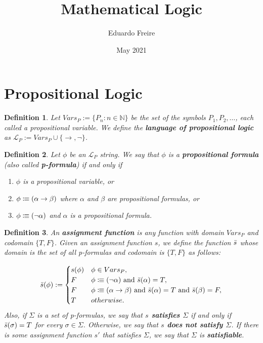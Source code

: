 \documentclass[leqno]{article}
\title{Mathematical Logic}
\author{Eduardo Freire}
\date{May 2021}
\newtheorem{definition}{Definition}[section]
\newcommand{\N}{\mathbb{N}}
\newcommand{\set}[1]{\{#1\}}
\newcommand{\lang}{\mathcal{L}}
\newcommand{\is}{\colonequiv}
\newcommand{\limplies}{\rightarrow}
\begin{document}
\maketitle

\section{Propositional Logic}
\begin{definition}
    Let $Vars_P := \set{P_n: n \in \N}$  be the set of the symbols $P_1, P_2, \dots $, each called a propositional variable. We define the \textbf{language of propositional logic} as $\lang_P := Vars_P \cup \set{\limplies, \neg}$.
\end{definition}

\begin{definition}
    Let $\phi$ be an $\lang_P$ string. We say that $\phi$ is a \textbf{propositional formula} (also called \textbf{p-formula}) if and only if
    
    \begin{enumerate}
        \item $\phi$ is a propositional variable, or
        \item $\phi \is (\alpha \limplies \beta)$ where $\alpha$ and $\beta$ are propositional formulas, or
        \item $\phi \is (\neg \alpha)$ and $\alpha$ is a propositional formula.
    \end{enumerate}
\end{definition}

\begin{definition}
    An \textbf{assignment function} is any function with domain $Vars_P$ and codomain $\set{T, F}$. Given an assignment function $s$, we define the function $\Bar{s}$ whose domain is the set of all p-formulas and codomain is $\set{T, F}$ as follows:
    
    \begin{equation*}
        \Bar{s}(\phi) := 
        \begin{cases}
        s(\phi) & \phi \in Vars_P, \\
        F & \phi \is (\neg \alpha) \text{ and } \Bar{s}(\alpha) = T,\\
        F & \phi \is (\alpha \limplies \beta) \text{ and } \Bar{s}(\alpha) = T \text{ and } \Bar{s}(\beta) = F,\\
        T & otherwise.
        \end{cases}
    \end{equation*} Also, if $\Sigma$ is a set of p-formulas, we say that \textbf{$s$ satisfies $\Sigma$} if and only if $\Bar{s}(\sigma) = T$ for every $\sigma \in \Sigma$. Otherwise, we say that \textbf{$s$ does not satisfy $\Sigma$}. If there is some assignment function $s'$ that satisfies $\Sigma$, we say that $\Sigma$ is \textbf{satisfiable}.
\end{definition}
\end{document}
